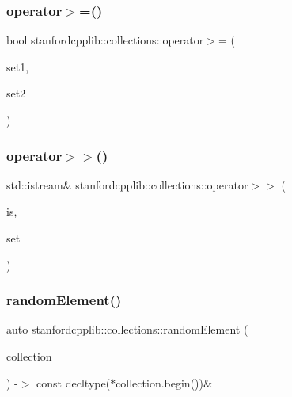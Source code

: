 \subsubsection{\texorpdfstring{operator$>$=()}{operator>=()}}
{\footnotesize\ttfamily bool stanfordcpplib\+::collections\+::operator$>$= (\begin{DoxyParamCaption}\item[{const \mbox{\hyperlink{classstanfordcpplib_1_1collections_1_1GenericSet}{Generic\+Set}}$<$ \mbox{\hyperlink{structstanfordcpplib_1_1collections_1_1SetTraits}{Set\+Traits}} $>$ \&}]{set1,  }\item[{const \mbox{\hyperlink{classstanfordcpplib_1_1collections_1_1GenericSet}{Generic\+Set}}$<$ \mbox{\hyperlink{structstanfordcpplib_1_1collections_1_1SetTraits}{Set\+Traits}} $>$ \&}]{set2 }\end{DoxyParamCaption})}

\mbox{\label{namespacestanfordcpplib_1_1collections_afd211a8f34fadfd9aa8c4749432437b8}} 
\subsubsection{\texorpdfstring{operator$>$$>$()}{operator>>()}}
{\footnotesize\ttfamily std\+::istream\& stanfordcpplib\+::collections\+::operator$>$$>$ (\begin{DoxyParamCaption}\item[{std\+::istream \&}]{is,  }\item[{\mbox{\hyperlink{classstanfordcpplib_1_1collections_1_1GenericSet}{Generic\+Set}}$<$ \mbox{\hyperlink{structstanfordcpplib_1_1collections_1_1SetTraits}{Set\+Traits}} $>$ \&}]{set }\end{DoxyParamCaption})}

\mbox{\label{namespacestanfordcpplib_1_1collections_a189ddb6ed4fe9f98bce310facfc6612d}} 
\subsubsection{\texorpdfstring{random\+Element()}{randomElement()}}
{\footnotesize\ttfamily auto stanfordcpplib\+::collections\+::random\+Element (\begin{DoxyParamCaption}\item[{const Collection \&}]{collection }\end{DoxyParamCaption}) -\/$>$ const decltype($\ast$collection.\+begin())\& }


